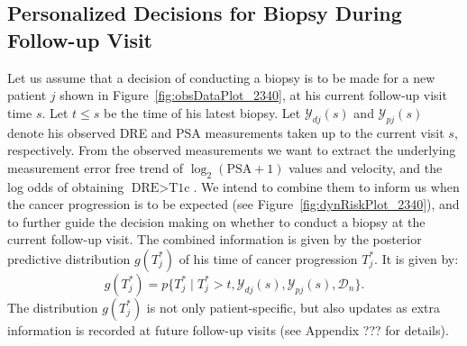 \subsection{Personalized Decisions for Biopsy During Follow-up Visit}
\label{subsec:pers_decision_making}
Let us assume that a decision of conducting a biopsy is to be made for a new patient $j$ shown in Figure~\ref{fig:obsDataPlot_2340}, at his current follow-up visit time $s$. Let $t\leq s$ be the time of his latest biopsy. Let $\mathcal{Y}_{dj}(s)$ and $\mathcal{Y}_{pj}(s)$ denote his observed DRE and PSA measurements taken up to the current visit $s$, respectively. From the observed measurements we want to extract the underlying measurement error free trend of $\log_2 (\mbox{PSA} + 1)$ values and velocity, and the log odds of obtaining $\mbox{DRE} > \mbox{T1c}$. We intend to combine them to inform us when the cancer progression is to be expected (see Figure~\ref{fig:dynRiskPlot_2340}), and to further guide the decision making on whether to conduct a biopsy at the current follow-up visit. The combined information is given by the posterior predictive distribution $g(T^*_j)$ of his time of cancer progression $T^*_j$. It is given by:
\begin{equation}
\label{eq:post_pred_dist}
g(T^*_j) = p\big\{T^*_j \mid T^*_j > t, \mathcal{Y}_{dj}(s), \mathcal{Y}_{pj}(s), \mathcal{D}_n\big\}.
\end{equation}
The distribution $g(T^*_j)$ is not only patient-specific, but also updates as extra information is recorded at future follow-up visits (see Appendix ??? for details).


